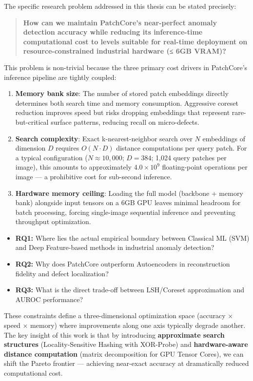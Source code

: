 The specific research problem addressed in this thesis can be stated precisely:

\begin{quote}
\textbf{How can we maintain PatchCore's near-perfect anomaly detection accuracy while reducing its inference-time computational cost to levels suitable for real-time deployment on resource-constrained industrial hardware (≤ 6GB VRAM)?}
\end{quote}

This problem is non-trivial because the three primary cost drivers in PatchCore's inference pipeline are tightly coupled:

\begin{enumerate}
\def\labelenumi{\arabic{enumi}.}
\item
  \textbf{Memory bank size}: The number of stored patch embeddings directly determines both search time and memory consumption. Aggressive coreset reduction improves speed but risks dropping embeddings that represent rare-but-critical surface patterns, reducing recall on micro-defects.
\item
  \textbf{Search complexity}: Exact k-nearest-neighbor search over \(N\) embeddings of dimension \(D\) requires \(O(N \cdot D)\) distance computations per query patch. For a typical configuration (\(N \approx 10{,}000\); \(D = 384\); 1,024 query patches per image), this amounts to approximately \(4.0 \times 10^9\) floating-point operations per image --- a prohibitive cost for sub-second inference.
\item
  \textbf{Hardware memory ceiling}: Loading the full model (backbone + memory bank) alongside input tensors on a 6GB GPU leaves minimal headroom for batch processing, forcing single-image sequential inference and preventing throughput optimization.
\end{enumerate}

\begin{itemize}
\tightlist
\item
  \textbf{RQ1:} Where lies the actual empirical boundary between Classical ML (SVM) and Deep Feature-based methods in industrial anomaly detection?
\item
  \textbf{RQ2:} Why does PatchCore outperform Autoencoders in reconstruction fidelity and defect localization?
\item
  \textbf{RQ3:} What is the direct trade-off between LSH/Coreset approximation and AUROC performance?
\end{itemize}

These constraints define a three-dimensional optimization space (accuracy × speed × memory) where improvements along one axis typically degrade another. The key insight of this work is that by introducing \textbf{approximate search structures} (Locality-Sensitive Hashing with XOR-Probe) and \textbf{hardware-aware distance computation} (matrix decomposition for GPU Tensor Cores), we can shift the Pareto frontier --- achieving near-exact accuracy at dramatically reduced computational cost.

